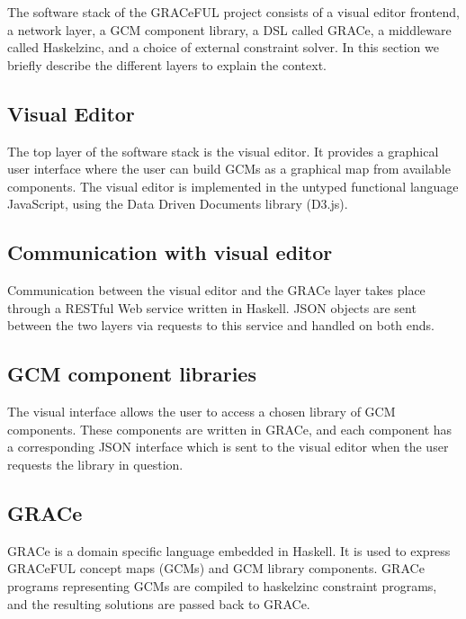 The software stack of the GRACeFUL project consists of
%
a visual editor frontend,
%
a network layer,
%
a GCM component library,
%
a DSL called GRACe,
%
a middleware called Haskelzinc, and
%
a choice of external constraint solver.
%
In this section we briefly describe the different layers to explain
the context.

\subsection{Visual Editor}

The top layer of the software stack is the visual editor.
%
It provides a graphical user interface where the user can build GCMs
as a graphical map from available components.
%
The visual editor is implemented in the untyped functional language
JavaScript, using the Data Driven Documents library (D3.js).
%

\subsection{Communication with visual editor}

Communication between the visual editor and the GRACe layer takes
place through a RESTful Web service written in Haskell.
%
JSON objects are sent between the two layers via requests to this
service and handled on both ends.

\subsection{GCM component libraries}

The visual interface allows the user to access a chosen library of GCM
components.
%
These components are written in GRACe, and each component has a
corresponding JSON interface which is sent to the visual editor when
the user requests the library in question.

\subsection{GRACe}

GRACe is a domain specific language embedded in Haskell.
%
It is used to express GRACeFUL concept maps (GCMs) and GCM library
components.
%
GRACe programs representing GCMs are compiled to haskelzinc constraint
programs, and the resulting solutions are passed back to GRACe.

